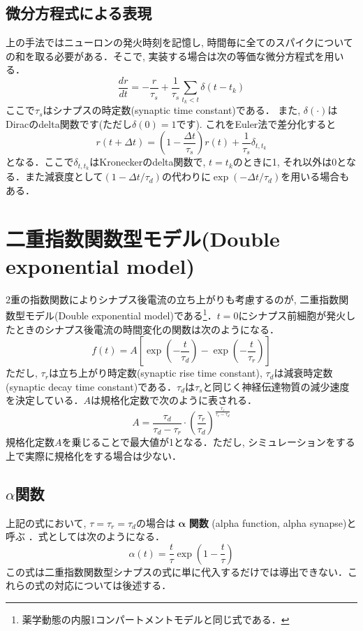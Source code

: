 \subsection{微分方程式による表現}
上の手法ではニューロンの発火時刻を記憶し, 時間毎に全てのスパイクについての和を取る必要がある．そこで, 実装する場合は次の等価な微分方程式を用いる．
\begin{equation}
\frac{dr}{dt}=-\frac{r}{\tau_{s}}+\frac{1}{\tau_{s}} \sum_{t_{k}< t} \delta\left(t-t_{k}\right)   
\end{equation}
ここで$\tau_s$はシナプスの時定数(synaptic time constant)である． また, $\delta(\cdot)$はDiracのdelta関数です(ただし$\delta(0)=1$です). これをEuler法で差分化すると 
\begin{equation}
r(t+\Delta t)=\left(1-\frac{\Delta t}{\tau_{s}}\right)r(t)+\frac{1}{\tau_{s}}\delta_{t,t_{k}} 
\end{equation}
となる．ここで$\delta_{t,t_{k}}$はKroneckerのdelta関数で, $t=t_{k}$のときに1, それ以外は0となる．また減衰度として$\left(1-\Delta  t/\tau_{d}\right)$の代わりに$\exp\left(-\Delta t/\tau_{d}\right)$を用いる場合もある．
\section{二重指数関数型モデル(Double exponential model)}
2重の指数関数によりシナプス後電流の立ち上がりも考慮するのが, 二重指数関数型モデル(Double exponential model)である\footnote{薬学動態の内服1コンパートメントモデルと同じ式である．}．$t=0$にシナプス前細胞が発火したときのシナプス後電流の時間変化の関数は次のようになる．
\begin{equation}
f(t)=A\left[\exp\left(-\frac{t}{\tau_d}\right)-\exp\left(-\frac{t}{\tau_r}\right)\right]    
\end{equation}
ただし, ${\tau_r}$は立ち上がり時定数(synaptic rise time constant), ${\tau_d}$は減衰時定数(synaptic decay time constant)である．$\tau_{d}$は$\tau_{s}$と同じく神経伝達物質の減少速度を決定している．$A$は規格化定数で次のように表される．
\begin{equation}
A=\frac{\tau_d}{\tau_d-\tau_r}\cdot \left(\frac{\tau_r}{\tau_d}\right)^\frac{\tau_r}{\tau_r-\tau_d}    
\end{equation}
規格化定数$A$を乗じることで最大値が1となる．ただし, シミュレーションをする上で実際に規格化をする場合は少ない．
\subsection{$\alpha$関数}
上記の式において, $\tau=\tau_{r}=\tau_{d}$の場合は $\boldsymbol{\alpha}$ \textbf{関数} (alpha function, alpha synapse)と呼ぶ \citep{Rall1967-gn}．式としては次のようになる．
\begin{equation}
\alpha(t)=\frac{t}{\tau}\exp\left(1-\frac{t}{\tau}\right)    
\end{equation}
この式は二重指数関数型シナプスの式に単に代入するだけでは導出できない．これらの式の対応については後述する．
